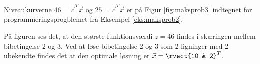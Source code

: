 \begin{eks}
Niveaukurverne $46=\vec{c}^T \vec{x}$ og $25=\vec{c}^T \vec{x}$ er på Figur \ref{fig:maksprob3} indtegnet for programmeringsprogblemet fra Eksempel \ref{eks:maksprob2}.

	\begin{center}	
		
		\label{fig:maksprob3}
	\end{center}
	
På figuren ses det, at den største funktionsværdi $z=46$ findes i skæringen mellem bibetingelse 2 og 3.
Ved at løse bibetingelse 2 og 3 som 2 ligninger med 2 ubekendte findes det at den optimale løsning er $\vec{x}=\rvect{10 & 2}^T.$
\label{eks:maksprob3}
\end{eks}
%
%
